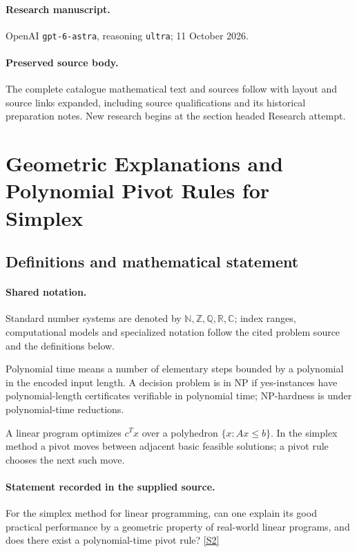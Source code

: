 \documentclass[11pt]{article}
\begin{document}
\paragraph{Research manuscript.} OpenAI \texttt{gpt-6-astra}, reasoning \texttt{ultra}; 11 October 2026.
\paragraph{Preserved source body.} The complete catalogue mathematical text and sources follow with layout and source links expanded, including source qualifications and its historical preparation notes. New research begins at the section headed Research attempt.

\section{Geometric Explanations and Polynomial Pivot Rules for Simplex}\label{statement}

\subsection{Definitions and mathematical statement}

\paragraph{Shared notation.}Standard number systems are denoted by $\mathbb N,\mathbb Z,\mathbb Q,\mathbb R,\mathbb C$; index ranges, computational models and specialized notation follow the cited problem source and the definitions below.


Polynomial time means a number of elementary steps bounded by a polynomial in the encoded input length. A decision problem is in $\mathrm{NP}$ if yes-instances have polynomial-length certificates verifiable in polynomial time; NP-hardness is under polynomial-time reductions.

A linear program optimizes $c^Tx$ over a polyhedron $\{x:Ax\leq b\}$. In the simplex method a pivot moves between adjacent basic feasible solutions; a pivot rule chooses the next such move.
\paragraph{Statement recorded in the supplied source.}
For the simplex method for linear programming, can one explain its good practical performance by a geometric property of real-world linear programs, and does there exist a polynomial-time pivot rule? \href{https://doi.org/10.4171/owr/2018/54}{[S2]}
\end{document}
